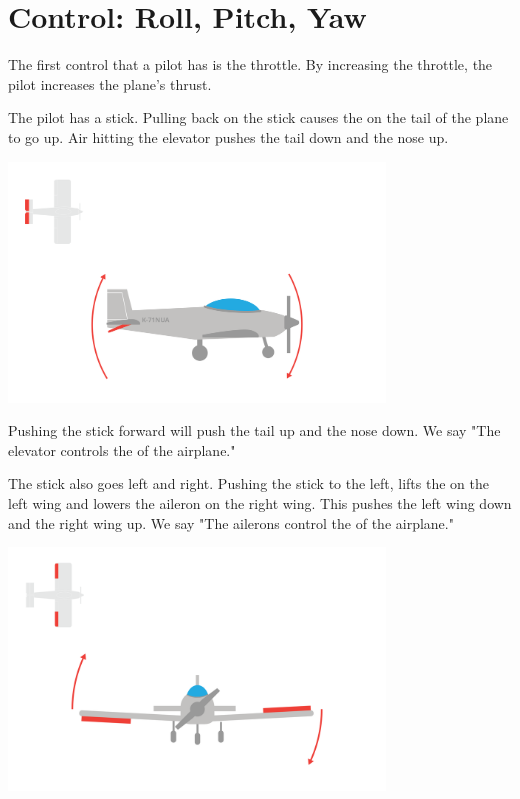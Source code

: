 \section{Control: Roll, Pitch, Yaw}
The first control that a pilot has is the throttle. By increasing the throttle, the pilot increases the plane's thrust.

The pilot has a stick.  Pulling back on the stick causes the  on the tail of the plane to go up.  Air hitting the elevator pushes the tail down and the nose up. 

\begin{center}
    \includegraphics[width=0.75\textwidth]{elevator.png}
    
\end{center}

Pushing the stick forward will push the tail up and the nose down.  We say "The elevator controls the  of the airplane."

The stick also goes left and right. Pushing the stick to the left,  lifts the  on the left wing and lowers the aileron on the right wing.  This pushes the left wing down and 
the right wing up.  We say "The ailerons control the   of the airplane."

\begin{center}
    \includegraphics[width=0.75\textwidth]{ailerons.png}
    
\end{center}

